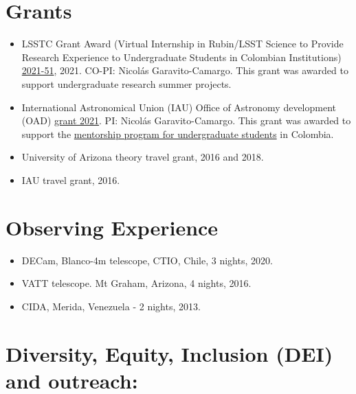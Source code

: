 \documentclass[UTF8]{article}
\begin{document}
\section*{Grants}
\begin{itemize}
\setlength\itemsep{0.0em}
\renewcommand\labelitemi{$\cdot$}
\item LSSTC Grant Award (Virtual Internship in Rubin/LSST Science to Provide Research Experience to Undergraduate Students in Colombian Institutions)
  \href{https://lsstdiscoveryalliance.org/programs/science-catalyst-grants/2021/}{2021-51},
  2021. CO-PI: Nicol\'as Garavito-Camargo. This grant was awarded to support undergraduate research summer projects. 
\item International Astronomical Union (IAU) Office of Astronomy development
  (OAD)
  \href{https://www.astro4dev.org/category/a-virtual-community-mentorship-program-for-development-in-colombia/}{grant
  2021}. PI: Nicol\'as Garavito-Camargo. This grant was awarded to support the \href{https://www.astroreca.org/en/mentoring}{mentorship program for undergraduate students} in Colombia. 
\item University of Arizona theory travel grant, 2016 and 2018. 
\item IAU travel grant, 2016.
\end{itemize}

\section*{Observing Experience}
\begin{itemize}
  \setlength\itemsep{0.0em}
  \renewcommand\labelitemi{$\cdot$}
    \item DECam, Blanco-4m telescope, CTIO, Chile, 3 nights, 2020.
    \item VATT telescope. Mt Graham, Arizona, 4 nights, 2016.
    \item CIDA, Merida, Venezuela - 2 nights, 2013.
\end{itemize}

\section*{Diversity, Equity, Inclusion (DEI) and outreach:}
\end{document}

